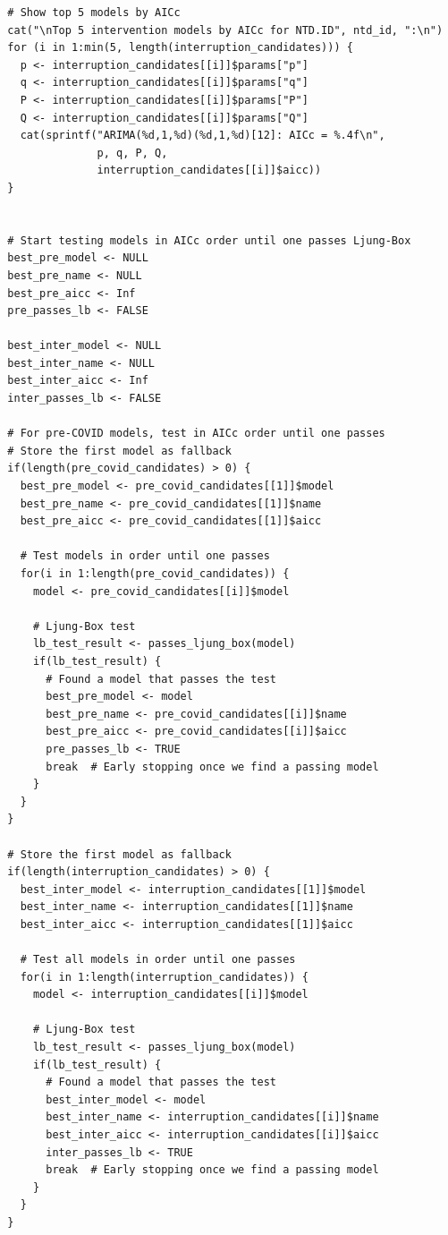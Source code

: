 \documentclass[11pt]{article}
\begin{document}
{\begin{verbatim}
  # Show top 5 models by AICc
  cat("\nTop 5 intervention models by AICc for NTD.ID", ntd_id, ":\n")
  for (i in 1:min(5, length(interruption_candidates))) {
    p <- interruption_candidates[[i]]$params["p"]
    q <- interruption_candidates[[i]]$params["q"]
    P <- interruption_candidates[[i]]$params["P"]
    Q <- interruption_candidates[[i]]$params["Q"]
    cat(sprintf("ARIMA(%d,1,%d)(%d,1,%d)[12]: AICc = %.4f\n", 
                p, q, P, Q,
                interruption_candidates[[i]]$aicc))
  }
  
  
  # Start testing models in AICc order until one passes Ljung-Box
  best_pre_model <- NULL
  best_pre_name <- NULL
  best_pre_aicc <- Inf
  pre_passes_lb <- FALSE
  
  best_inter_model <- NULL
  best_inter_name <- NULL
  best_inter_aicc <- Inf
  inter_passes_lb <- FALSE
  
  # For pre-COVID models, test in AICc order until one passes
  # Store the first model as fallback
  if(length(pre_covid_candidates) > 0) {
    best_pre_model <- pre_covid_candidates[[1]]$model
    best_pre_name <- pre_covid_candidates[[1]]$name
    best_pre_aicc <- pre_covid_candidates[[1]]$aicc
    
    # Test models in order until one passes
    for(i in 1:length(pre_covid_candidates)) {
      model <- pre_covid_candidates[[i]]$model
      
      # Ljung-Box test
      lb_test_result <- passes_ljung_box(model)
      if(lb_test_result) {
        # Found a model that passes the test
        best_pre_model <- model
        best_pre_name <- pre_covid_candidates[[i]]$name
        best_pre_aicc <- pre_covid_candidates[[i]]$aicc
        pre_passes_lb <- TRUE
        break  # Early stopping once we find a passing model
      }
    }
  }
  
  # Store the first model as fallback
  if(length(interruption_candidates) > 0) {
    best_inter_model <- interruption_candidates[[1]]$model
    best_inter_name <- interruption_candidates[[1]]$name
    best_inter_aicc <- interruption_candidates[[1]]$aicc
    
    # Test all models in order until one passes
    for(i in 1:length(interruption_candidates)) {
      model <- interruption_candidates[[i]]$model
      
      # Ljung-Box test
      lb_test_result <- passes_ljung_box(model)
      if(lb_test_result) {
        # Found a model that passes the test
        best_inter_model <- model
        best_inter_name <- interruption_candidates[[i]]$name
        best_inter_aicc <- interruption_candidates[[i]]$aicc
        inter_passes_lb <- TRUE
        break  # Early stopping once we find a passing model
      }
    }
  }
  

\end{verbatim}}
\end{document}
